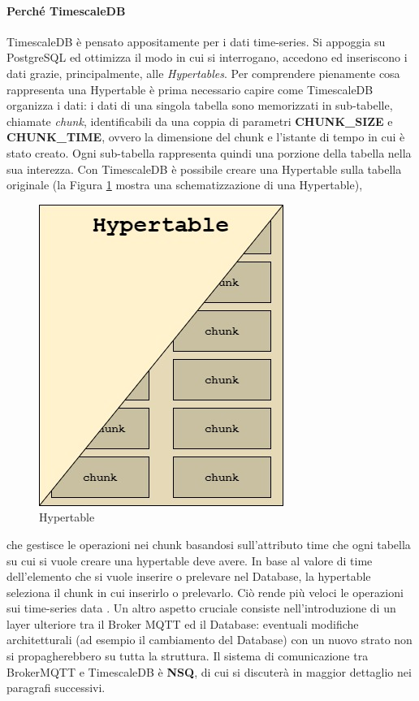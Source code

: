 \paragraph{Perché TimescaleDB} TimescaleDB è pensato appositamente per i dati time-series. Si appoggia su PostgreSQL ed ottimizza il modo in cui si interrogano, accedono ed inseriscono i dati grazie, principalmente, alle \textit{Hypertables}. Per comprendere pienamente cosa rappresenta una Hypertable è prima necessario capire come TimescaleDB organizza i dati: i dati di una singola tabella sono memorizzati in sub-tabelle, chiamate \textit{chunk}, identificabili da una coppia di parametri \textbf{CHUNK\_SIZE} e \textbf{CHUNK\_TIME}, ovvero la dimensione del chunk e l'istante di tempo in cui è stato creato. Ogni sub-tabella rappresenta quindi una porzione della tabella nella sua interezza. Con TimescaleDB è possibile creare una Hypertable sulla tabella originale (la Figura \ref{fig:hypertableconcept} mostra una schematizzazione di una Hypertable), 
\begin{figure}
    \includegraphics[scale=0.52]{images/hypertableconcept.jpg}
    \caption{Hypertable}
    \label{fig:hypertableconcept}
\end{figure}
che gestisce le operazioni nei chunk basandosi sull'attributo time che ogni tabella su cui si vuole creare una hypertable deve avere. 
In base al valore di time dell'elemento che si vuole inserire o prelevare nel Database, la hypertable seleziona il chunk in cui inserirlo o prelevarlo. Ciò rende più veloci le operazioni sui time-series data \cite{timescaledbperformance}. Un altro aspetto cruciale consiste nell'introduzione di un layer ulteriore tra il Broker MQTT ed il Database: eventuali modifiche architetturali (ad esempio il cambiamento del Database) con un nuovo strato non si propagherebbero su tutta la struttura. Il sistema di comunicazione tra BrokerMQTT e TimescaleDB è \textbf{NSQ}, di cui si discuterà in maggior dettaglio nei paragrafi successivi. \\ \\

